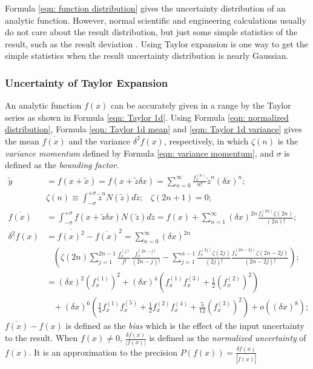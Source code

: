 \documentclass[twoside]{article}
\numberwithin{equation}{section}
\newcommand{\eqspace}{\;\;\;}
\begin{document}
\fi


Formula \eqref{eqn: function distribution} gives the uncertainty distribution of an analytic function.
However, normal scientific and engineering calculations usually do not care about the result distribution, but just some simple statistics of the result, such as the result deviation \cite{Statistical_Methods} \cite{Precisions_Physical_Measurements}.
Using Taylor expansion is one way to get the simple statistics when the result uncertainty distribution is nearly Gaussian.

\subsubsection{Uncertainty of Taylor Expansion}

An analytic function $f(x)$ can be accurately given in a range by the Taylor series as shown in Formula \eqref{eqn: Taylor 1d}.
Using Formula \eqref{eqn: normalized distribution}, Formula \eqref{eqn: Taylor 1d mean} and \eqref{eqn: Taylor 1d variance} \cite{Prev_Precision_Arithmetic} gives the mean $\overline{f(x)}$ and the variance $\delta^2 f(x)$, respectively, in which $\zeta(n)$ is the \emph{variance momentum} defined by Formula \eqref{eqn: variance momentum}, and $\sigma$ is defined as the \emph{bounding factor}.
\begin{align}
\label{eqn: Taylor 1d} 
\tilde{y} &= f(x + \tilde{x}) = f(x + \tilde{z} \delta x) = \sum_{n=0}^{\infty} \frac{f^{(n)}_x}{n!} \tilde{z}^n (\delta x)^n; \\
\label{eqn: variance momentum}
& \zeta(n) \equiv \int_{-\sigma}^{+\sigma} \tilde{z}^n N(\tilde{z}) d \tilde{z};\eqspace \zeta(2n+1) = 0; \\
\label{eqn: Taylor 1d mean}
\overline{f(x)} &= \int_{-\sigma}^{+\sigma} f(x + \tilde{z} \delta x) N(\tilde{z}) d \tilde{z}
  = f(x) + \sum_{n=1}^{\infty}(\delta x)^{2n} \frac{f^{(2n)}_x \zeta(2n)}{(2n)!}; \\
\delta^2 f(x) &= \overline{f(x)^2} - \overline{f(x)}^2 = \sum_{n=0}^{\infty} (\delta x)^{2n}  \nonumber \\
\label{eqn: Taylor 1d variance}
&\eqspace \left( \zeta(2n) \sum_{j=1}^{2n-1} \frac{f^{(j)}_x}{j!} \frac{f^{(2n-j)}_x}{(2n-j)!} - 
 	\sum_{j=1}^{n-1} \frac{f^{(2j)}_x \zeta(2j)}{(2j)!} \frac{f^{(2n-2j)}_x \zeta(2n - 2j)}{(2n-2j)!} \right); \\
  &= (\delta x)^2 (f^{(1)}_x)^2 + (\delta x)^4 \left(f^{(1)}_x f^{(3)}_x + \frac{1}{2} (f^{(2)}_x)^2 \right) \nonumber \\
  &\eqspace + (\delta x)^6 \left(\frac{1}{4} f^{(1)}_x f^{(5)}_x + \frac{1}{2} f^{(2)}_x f^{(4)}_x + \frac{5}{12} (f^{(3)}_x)^2 \right) + o((\delta x)^8);
\end{align}
$\overline{f(x)} - f(x)$ is defined as the \emph{bias} which is the effect of the input uncertainty to the result.
When $f(x) \neq 0$, $\frac{\delta f(x)}{|f(x)|}$ is defined as the \emph{normalized uncertainty} of $f(x)$.  
It is an approximation to the precision $P(f(x)) =\frac{\delta f(x)}{|\overline{f(x)}|}$
\end{document}

